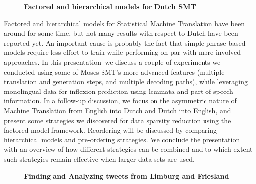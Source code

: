 \documentclass[10pt, a4paper, twopage, headinclude, footinclude, BCOR5mm]{book}
\begin{document}
\newpage

\begin{figure}[t!]
\centering
\large\textbf{Factored and hierarchical models for Dutch SMT}
\vspace*{0.5cm}
\end{figure}


\begin{table}[t!]
\end{table} 
\noindent
Factored and hierarchical models for Statistical Machine Translation have been around for some time, but not many results with respect to Dutch have been reported yet. An important cause is probably the fact that simple phrase-based models require less effort to train while performing on par with more involved approaches.  In this presentation, we discuss a couple of experiments we conducted using some of Moses SMT’s more advanced features (multiple translation and generation steps, and multiple decoding paths), while leveraging monolingual data for inflexion prediction using lemmata and part-of-speech information.  In a follow-up discussion, we focus on the asymmetric nature of Machine Translation from English into Dutch and Dutch into English, and present some strategies we discovered for data sparsity reduction using the factored model framework. Reordering will be discussed by comparing hierarchical models and pre-ordering strategies.  We conclude the presentation with an overview of how different strategies can be combined and to which extent such strategies remain effective when larger data sets are used.   

\newpage

\begin{figure}[t!]
\centering
\large\textbf{Finding and Analyzing tweets from Limburg and Friesland}
\vspace*{0.5cm}
\end{figure}
\end{document}
